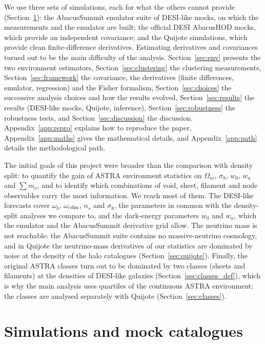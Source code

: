 \documentclass[11pt,twocolumn]{article}
\begin{document}
We use three sets of simulations, each for what the others cannot provide (Section~\ref{sec:sims}): the AbacusSummit emulator suite of DESI-like mocks, on which the measurements and the emulator are built; the official DESI AbacusHOD mocks, which provide an independent covariance; and the Quijote simulations, which provide clean finite-difference derivatives. Estimating derivatives and covariances turned out to be the main difficulty of the analysis. Section~\ref{sec:env} presents the two environment estimators, Section~\ref{sec:clustering} the clustering measurements, Section~\ref{sec:framework} the covariance, the derivatives (finite differences, emulator, regression) and the Fisher formalism, Section~\ref{sec:choices} the successive analysis choices and how the results evolved, Section~\ref{sec:results} the results (DESI-like mocks, Quijote, inference), Section~\ref{sec:robustness} the robustness tests, and Section~\ref{sec:discussion} the discussion. Appendix~\ref{app:repro} explains how to reproduce the paper, Appendix~\ref{app:maths} gives the mathematical details, and Appendix~\ref{app:path} details the methodological path.

The initial goals of this project were broader than the comparison with density split: to quantify the gain of ASTRA environment statistics on $\Omega_m$, $\sigma_8$, $w_0$, $w_a$ and $\sum m_\nu$, and to identify which combinations of void, sheet, filament and node observables carry the most information. We reach most of them. The DESI-like forecasts cover $\omega_b$, $\omega_{\rm cdm}$, $n_s$ and $\sigma_8$, the parameters in common with the density-split analyses we compare to, and the dark-energy parameters $w_0$ and $w_a$, which the emulator and the AbacusSummit derivative grid allow. The neutrino mass is not reachable: the AbacusSummit suite contains no massive-neutrino cosmology, and in Quijote the neutrino-mass derivatives of our statistics are dominated by noise at the density of the halo catalogues (Section~\ref{sec:quijote}). Finally, the original ASTRA classes turn out to be dominated by two classes (sheets and filaments) at the densities of DESI-like galaxies (Section~\ref{sec:classes_def}), which is why the main analysis uses quartiles of the continuous ASTRA environment; the classes are analysed separately with Quijote (Section~\ref{sec:classes}).

\section{Simulations and mock catalogues}
\label{sec:sims}
\end{document}
